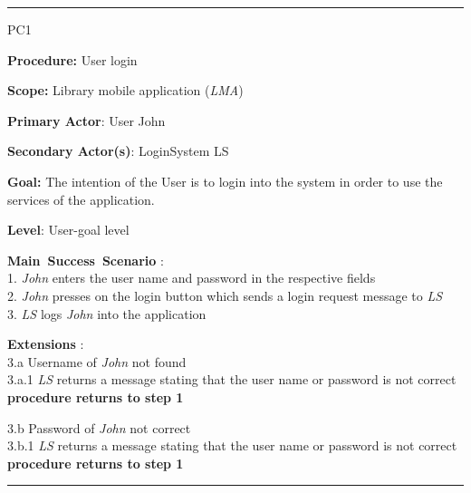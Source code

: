 \vspace{0.5cm}
\hrule
\begin{lyxlist}{PC1}
\small{
\item [\textbf{Procedure:}] User login
\item [\textbf{Scope:}] Library mobile application (\emph{LMA})
\item [\textbf{Primary Actor}:] User John
\item [\textbf{Secondary Actor(s)}:] LoginSystem LS
\item [\textbf{Goal:}] The intention of the User is to login into the system in
order to use the services of the application.
\item [\textbf{Level}:] User-goal level
\item [\textbf{Main~Success~Scenario}]:\\
1. \emph{John} enters the user name and password in the respective fields\\
2. \emph{John} presses on the login button which sends a login request message
to \emph{LS}\\
3. \emph{LS} logs \emph{John} into the application\\


\item [\textbf{Extensions}]:\\
3.a Username of \emph{John} not found\\
\hspace*{0.5cm} 3.a.1 \emph{LS} returns a message stating that the user name
or password is not correct \\
\hspace*{0.5cm} \textbf{procedure returns to step 1}

3.b Password of \emph{John} not correct \\
\hspace*{0.5cm} 3.b.1 \emph{LS} returns a message stating that the user name
or password is not correct \\
\hspace*{0.5cm} \textbf{procedure returns to step 1}

}

\end{lyxlist}
\hrule



%

